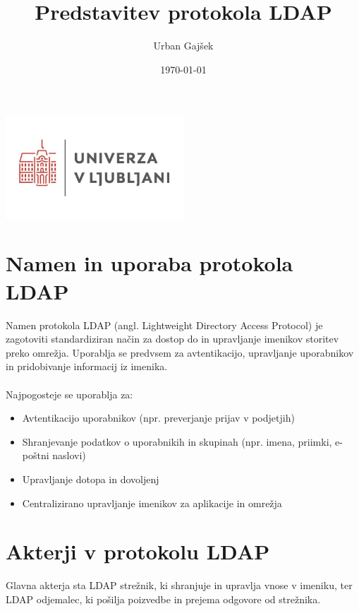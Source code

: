 \documentclass{article}
\begin{document}
\title{Predstavitev protokola LDAP}
\author{Urban Gajšek}
\date{\today}

\maketitle

\begin{center}
    \includegraphics[width=0.5\textwidth]{figures/univerza-v-ljubljani.png}
\end{center}

\newpage
\tableofcontents
\newpage

\section{Namen in uporaba protokola LDAP}
Namen protokola LDAP (angl. Lightweight Directory Access Protocol) je zagotoviti standardiziran način za dostop do in upravljanje imenikov storitev preko omrežja. Uporablja se predvsem za avtentikacijo, upravljanje uporabnikov in pridobivanje informacij iz imenika.
\paragraph{}
Najpogosteje se uporablja za:
\begin{itemize}
    \item Avtentikacijo uporabnikov (npr. preverjanje prijav v podjetjih)
    \item Shranjevanje podatkov o uporabnikih in skupinah (npr. imena, priimki, e-poštni naslovi)
    \item Upravljanje dotopa in dovoljenj
    \item Centralizirano upravljanje imenikov za aplikacije in omrežja
\end{itemize}

\section{Akterji v protokolu LDAP}
Glavna akterja sta LDAP strežnik, ki shranjuje in upravlja vnose v imeniku, ter LDAP odjemalec, ki pošilja poizvedbe in prejema odgovore od strežnika.
\end{document}

